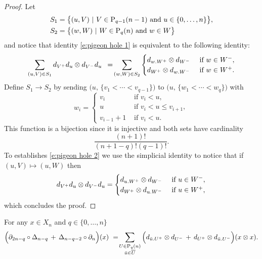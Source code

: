\begin{proof}
	Let
	\begin{align*}
	& S_1 = \big\{ (u, V)\ |\ V \in \P_{q-1}(n-1) \text{ and } u \in \{0,\dots,n\} \big\}, \\
	& S_2 = \big\{ (w, W)\ |\ W \in \P_{q}(n) \text{ and } w \in W \big\}
	\end{align*}
	and notice that identity \eqref{e:pigeon hole 1} is equivalent to the following identity:
	\begin{equation} \label{e:pigeon hole 2}
	\sum_{(u, V) \in S_1} d_{V^+}d_u \tensor d_{V^-}d_u \ \, = \!
	\sum_{(w, W) \in S_2} 
	\begin{cases}
	d_{w.W^+} \tensor d_{W^-} & \text{ if } w \in W^-, \\
	d_{W^+} \tensor d_{w.W^-} & \text{ if } w \in W^+.
	\end{cases}
	\end{equation}	
	Define $S_1 \to S_2$ by sending $\big(u,\, \{v_1 < \cdots < v_{q-1}\} \big)$ to $\big(u,\, \{w_1 < \cdots < w_{q}\} \big)$ with
	\begin{equation*}
	w_i = 
	\begin{cases}
	v_i & \text{ if } v_i < u, \\
	u & \text{ if } v_i < u \leq v_{i+1}, \\
	v_{i-1}+1 & \text{ if } v_i < u.
	\end{cases}
	\end{equation*} 
	This function is a bijection since it is injective and both sets have cardinality 
	\begin{equation*}
	\frac{(n+1)!}{(n+1-q)!(q-1)!}.
	\end{equation*}
	To establishes \eqref{e:pigeon hole 2} we use the simplicial identity to notice that if $(u, V) \mapsto (u, W)$ then
	\begin{equation*}
	d_{V^+}d_u \tensor d_{V^-}d_u =
	\begin{cases}
	d_{u.W^+} \tensor d_{W^-} & \text{ if } u \in W^-, \\
	d_{W^+} \tensor d_{u.W^-} & \text{ if } u \in W^+,
	\end{cases}
	\end{equation*}
	which concludes the proof.
\end{proof}


\begin{lemma} \label{l:boundary of Delta}
	For any $x \in X_n$ and $q \in \{0, \dots, n\}$
	\begin{equation} \label{e:boundary of Delta}
	\Big( \partial_{2n-q} \circ \Delta_{n - q} \, +\, \Delta_{n-q-2} \circ \partial_n \Big) (x) \ = \! 
	\sum_{\substack{U \in \P_{q}(n) \\ \bar u \in \overline{U}}} \Big( d_{\bar u.U^+} \tensor d_{U^-} \, + \, d_{U^+} \tensor d_{\bar u.U^-} \Big) (x \otimes x).
	\end{equation}
\end{lemma}

